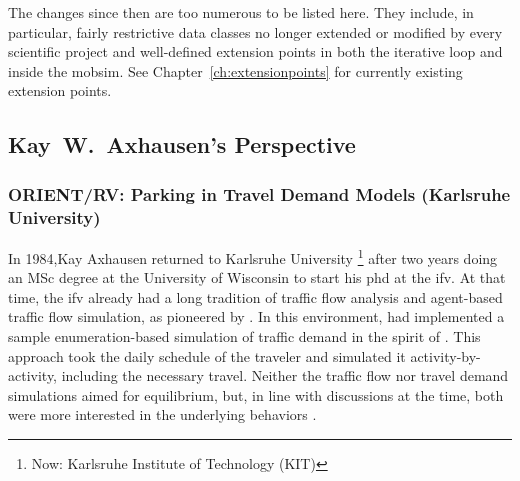 The changes since then are too numerous to be listed here.  They include, in particular, fairly restrictive data classes no longer extended or modified by every scientific project and well-defined extension points in both the iterative loop and inside the \gls{mobsim}.  See Chapter~\ref{ch:extensionpoints} for currently existing extension points.


\subsection{Kay~W.~Axhausen's Perspective}
\subsubsection{ORIENT/RV: Parking in Travel Demand Models (Karlsruhe University)}
In 1984,Kay Axhausen returned to Karlsruhe University%
\footnote{
Now: Karlsruhe Institute of Technology (KIT)
}
after two years doing an MSc degree at the University of Wisconsin to start his \acrshort{phd} at the \gls{ifv}. At that time, the \gls{ifv} already had a long tradition of traffic flow analysis \citep[][]{Leutzbach1972Buch} and agent-based traffic flow simulation, as pioneered by \citet[][]{Wiedemann_PhDThesis_1974} \citep[see also][]{LeutzbachWiedemann_TEC_1986}. In this environment, \citet[][]{Sparmann_TechRep_1980} had implemented a sample enumeration-based simulation of traffic demand in the spirit of \citet[][]{PoeckZumkeller_PTRC_1978}. This approach took the daily schedule of the traveler and simulated it activity-by-activity, including the necessary travel. Neither the traffic flow nor travel demand simulations aimed for equilibrium, but, in line with discussions at the time, both were more interested in the underlying behaviors \citep[e.g.,][]{JonesEtAl_1983}.

